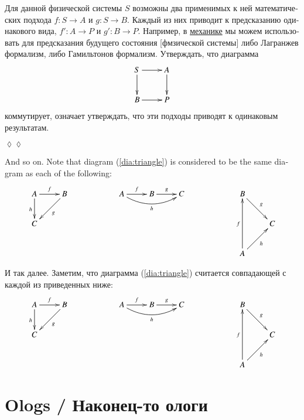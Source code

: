 \documentclass{book}
\def\to{\rightarrow}
\def\taking{\colon}
\theoremstyle{theoremENG}
\theoremstyle{lemmaENG}
\theoremstyle{propositionENG}
\theoremstyle{corollaryENG}
\theoremstyle{factENG}
\theoremstyle{remarkENG}
\theoremstyle{exampleENG}
\theoremstyle{warningENG}
\theoremstyle{questionENG}
\theoremstyle{guessENG}
\theoremstyle{answerENG}
\theoremstyle{constructionENG}
\theoremstyle{rulesENG}
\theoremstyle{excENG}
\theoremstyle{appENG}
\theoremstyle{definitionENG}
\theoremstyle{notationENG}
\theoremstyle{conjectureENG}
\theoremstyle{postulateENG}
\theoremstyle{theoremRUS}
\theoremstyle{lemmaRUS}
\theoremstyle{propositionRUS}
\theoremstyle{corollaryRUS}
\theoremstyle{factRUS}
\theoremstyle{remarkRUS}
\theoremstyle{exampleRUS}
\theoremstyle{warningRUS}
\theoremstyle{questionRUS}
\theoremstyle{guessRUS}
\theoremstyle{answerRUS}
\theoremstyle{constructionRUS}
\theoremstyle{rulesRUS}
\theoremstyle{excRUS}
\theoremstyle{appRUS}
\newtheorem{appRUS}[subsubsection]{\begin{russian}Прикладной пример (применение)\end{russian}}
\theoremstyle{definitionRUS}
\theoremstyle{notationRUS}
\theoremstyle{conjectureRUS}
\theoremstyle{postulateRUS}
\newenvironment{applicationRUS}{\begin{appRUS}}{\hspace*{\fill}$\lozenge\lozenge$\end{appRUS}}
\begin{document}
\begin{english}
\begin{applicationRUS}
\begin{russian} 
Для данной физической системы $S$ возможны два применимых к ней математических подхода $f\taking S\to A$ и $g\taking S\to B$. Каждый из них приводит к предсказанию одинакового вида, $f'\taking A\to P$ и $g'\taking B\to P$. Например, в \href{https://ru.wikipedia.org/wiki/%D0%93%D0%B0%D0%BC%D0%B8%D0%BB%D1%8C%D1%82%D0%BE%D0%BD%D0%BE%D0%B2%D0%B0_%D0%BC%D0%B5%D1%85%D0%B0%D0%BD%D0%B8%D0%BA%D0%B0#.D0.9F.D0.B5.D1.80.D0.B5.D1.84.D0.BE.D1.80.D0.BC.D1.83.D0.BB.D0.B8.D1.80.D0.BE.D0.B2.D0.BA.D0.B0_.D0.BB.D0.B0.D0.B3.D1.80.D0.B0.D0.BD.D0.B6.D0.B5.D0.B2.D0.BE.D0.B9_.D0.BC.D0.B5.D1.85.D0.B0.D0.BD.D0.B8.D0.BA.D0.B8}{\text механике} мы можем использовать для предсказания будущего состояния [фмзической системы] либо Лагранжев формализм, либо Гамильтонов формализм. Утверждать, что диаграмма 
$$
\xymatrix{S\ar[r]\ar[d]&A\ar[d]\\B\ar[r]&P}
$$
коммутирует, означает утверждать, что эти подходы приводят к одинаковым результатам.
\end{russian}
\end{applicationRUS}

And so on. Note that diagram (\ref{dia:triangle}) is considered to be the same diagram as each of the following:
$$
\xymatrix{A\ar[r]^f\ar[d]_h&B\ar[dl]^g\\C}\hspace{.8in}
\xymatrix{A\ar[r]^f\ar@/_1pc/[rr]_h&B\ar[r]^g&C}\hspace{.8in}
\xymatrix{B\ar[rd]^g\\&C\\A\ar[ru]_h\ar[uu]^f}$$

\begin{russian} 
И так далее. Заметим, что диаграмма (\ref{dia:triangle}) считается совпадающей с каждой из приведенных ниже:
$$
\xymatrix{A\ar[r]^f\ar[d]_h&B\ar[dl]^g\\C}\hspace{.8in}
\xymatrix{A\ar[r]^f\ar@/_1pc/[rr]_h&B\ar[r]^g&C}\hspace{.8in}
\xymatrix{B\ar[rd]^g\\&C\\A\ar[ru]_h\ar[uu]^f}$$
\end{russian}




\section{Ologs / Наконец-то ологи}\label{sec:ologs}


\end{english}
\end{document}
